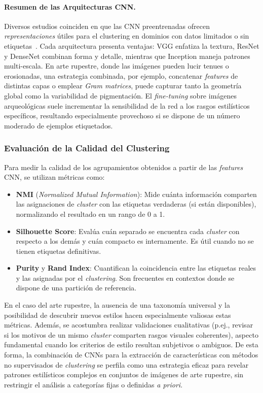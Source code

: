\paragraph{Resumen de las Arquitecturas CNN.}
Diversos estudios coinciden en que las CNN preentrenadas ofrecen \textit{representaciones} útiles para el clustering en dominios con datos limitados o sin etiquetas~\cite{guerin2018,gairola2020}.
Cada arquitectura presenta ventajas: VGG enfatiza la textura, ResNet y DenseNet combinan forma y detalle, mientras que Inception maneja patrones multi-escala.
En arte rupestre, donde las imágenes pueden lucir tenues o erosionadas, una estrategia combinada, por ejemplo, concatenar \textit{features} de distintas capas o emplear \textit{Gram matrices}, puede capturar tanto la geometría global como la variabilidad de pigmentación.
El \textit{fine-tuning} sobre imágenes arqueológicas suele incrementar la sensibilidad de la red a los rasgos estilísticos específicos, resultando especialmente provechoso si se dispone de un número moderado de ejemplos etiquetados.

\subsubsection*{Evaluación de la Calidad del Clustering}
Para medir la calidad de los agrupamientos obtenidos a partir de las \textit{features} CNN, se utilizan métricas como:
\begin{itemize}
    \item \textbf{NMI} (\textit{Normalized Mutual Information}): Mide cuánta información comparten las asignaciones de \textit{cluster} con las etiquetas verdaderas (si están disponibles), normalizando el resultado en un rango de 0 a 1.
    \item \textbf{Silhouette Score}: Evalúa cuán separado se encuentra cada \textit{cluster} con respecto a los demás y cuán compacto es internamente. Es útil cuando no se tienen etiquetas definitivas.
    \item \textbf{Purity} y \textbf{Rand Index}: Cuantifican la coincidencia entre las etiquetas reales y las asignadas por el \textit{clustering}. Son frecuentes en contextos donde se dispone de una partición de referencia.
\end{itemize}

En el caso del arte rupestre, la ausencia de una taxonomía universal y la posibilidad de descubrir nuevos estilos hacen especialmente valiosas estas métricas.
Además, se acostumbra realizar validaciones cualitativas (p.ej., revisar si los motivos de un mismo \textit{cluster} comparten rasgos visuales coherentes), aspecto fundamental cuando los criterios de estilo resultan subjetivos o ambiguos.
De esta forma, la combinación de CNNs para la extracción de características con métodos no supervisados de \textit{clustering} se perfila como una estrategia eficaz para revelar patrones estilísticos complejos en conjuntos de imágenes de arte rupestre, sin restringir el análisis a categorías fijas o definidas \textit{a priori}.

